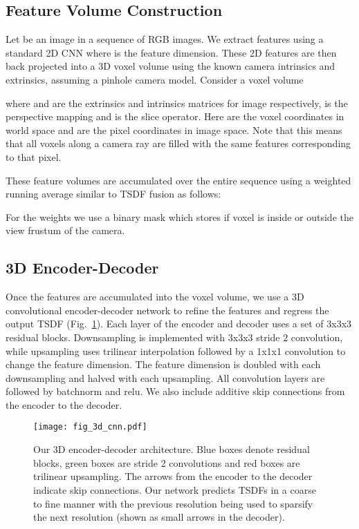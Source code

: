 \documentclass[runningheads]{llncs}
\begin{document}
\subsection{Feature Volume Construction}
Let  be an image in a sequence of  RGB images.
We extract features  using a standard 2D CNN where  is the feature dimension.
These 2D features are then back projected into a 3D voxel volume using the known camera intrinsics and extrinsics,
assuming a pinhole camera model. Consider a voxel volume 


where  and  are the extrinsics and intrinsics matrices for image  respectively,  is the perspective mapping and  is the slice operator.
Here  are the voxel coordinates in world space and  are the pixel coordinates in image space.
Note that this means that all voxels along a camera ray are filled with the same features corresponding to that pixel.

These feature volumes are accumulated over the entire sequence using a weighted running average similar to TSDF fusion as follows:


For the weights we use a binary mask  which stores if voxel  is inside or outside the view frustum of the camera.













\subsection{3D Encoder-Decoder}
Once the features are accumulated into the voxel volume, we use a 3D convolutional encoder-decoder network
to refine the features and regress the output TSDF (Fig.~\ref{fig:3dcnn}).
Each layer of the encoder and decoder uses a set of 3x3x3 residual blocks.
Downsampling is implemented with 3x3x3 stride 2 convolution,
while upsampling uses trilinear interpolation followed by a 1x1x1 convolution to change the feature dimension.
The feature dimension is doubled with each downsampling and halved with each upsampling.
All convolution layers are followed by batchnorm and relu.
We also include additive skip connections from the encoder to the decoder.

\begin{figure}
\centering
\texttt{[image: fig\_3d\_cnn.pdf]}
\caption{Our 3D encoder-decoder architecture. 
Blue boxes denote residual blocks,
green boxes are stride 2 convolutions and red boxes are trilinear upsampling.
The arrows from the encoder to the decoder indicate skip connections.
Our network predicts TSDFs in a coarse to fine manner with the previous resolution being used to sparsify the next resolution (shown as small arrows in the decoder).
}
\label{fig:3dcnn}
\end{figure}
\end{document}
